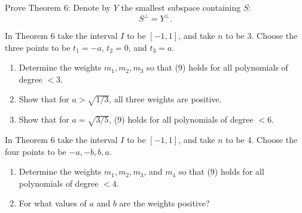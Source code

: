   \begin{exercise}[Lax 2.3] 
    Prove Theorem 6: Denote by $Y$ the smallest subspace containing $S$:
    \begin{equation}
      S^\perp = Y^\perp.
    \end{equation}
  \end{exercise}

  \begin{exercise}[Lax 2.4] 
    In Theorem 6 take the interval $I$ to be $[-1, 1]$, and take $n$ to be 3. Choose the three points to be $t_1 = -a$, $t_2 = 0$, and $t_3 = a$.
    
    \begin{enumerate}
      \item[(i)] Determine the weights $m_1, m_2, m_3$ so that (9) holds for all polynomials of degree $<3$.
      \item[(ii)] Show that for $a > \sqrt{1/3}$, all three weights are positive.
      \item[(iii)] Show that for $a = \sqrt{3/5}$, (9) holds for all polynomials of degree $<6$.
    \end{enumerate}
  \end{exercise}

  \begin{exercise}[Lax 2.5] 
    In Theorem 6 take the interval $I$ to be $[-1, 1]$, and take $n$ to be 4. Choose the four points to be $-a, -b, b, a$.
    
    \begin{enumerate}
      \item[(i)] Determine the weights $m_1, m_2, m_3$, and $m_4$ so that (9) holds for all polynomials of degree $<4$.
      \item[(ii)] For what values of $a$ and $b$ are the weights positive?
    \end{enumerate}
  \end{exercise}

